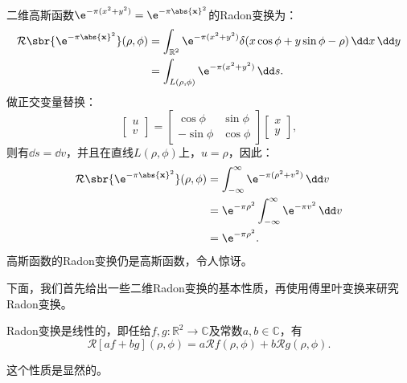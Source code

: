 \begin{example}[高斯函数的Radon变换]
    二维高斯函数$\e^{-\pi(x^2+y^2)}=\e^{-\pi\abs{\mathbf{x}}^2}$的Radon变换为：
    \begin{align}
        \mathcal{R}\sbr{\e^{-\pi\abs{\mathbf{x}}^2}}(\rho,\phi)&=\int_{\mathbb{R}^2}\e^{-\pi(x^2+y^2)}\delta(x\cos\phi+y\sin\phi-\rho)\,\dd x\,\dd y\nonumber\\
        &=\int_{L(\rho,\phi)}\e^{-\pi(x^2+y^2)}\,\dd s.
    \end{align}
    做正交变量替换：
    \begin{equation}
        \begin{bmatrix}u\\v\end{bmatrix}=\begin{bmatrix}
            \cos\phi & \sin\phi\\
            -\sin\phi & \cos\phi
        \end{bmatrix}\begin{bmatrix}x\\y\end{bmatrix},
    \end{equation}
    则有$\dd s=\dd v$，并且在直线$L(\rho,\phi)$上，$u=\rho$，因此：
    \begin{align}
        \mathcal{R}\sbr{\e^{-\pi\abs{\mathbf{x}}^2}}(\rho,\phi)&=\int_{-\infty}^{\infty}\e^{-\pi(\rho^2+v^2)}\,\dd v\nonumber\\
        &=\e^{-\pi\rho^2}\int_{-\infty}^{\infty}\e^{-\pi v^2}\,\dd v\nonumber\\
        &=\e^{-\pi\rho^2}.
    \end{align}
    高斯函数的Radon变换仍是高斯函数，令人惊讶。
\end{example}

下面，我们首先给出一些二维Radon变换的基本性质，再使用傅里叶变换来研究Radon变换。

\begin{proposition}[线性性]
    Radon变换是线性的，即任给$f,g:\mathbb{R}^2\to\mathbb{C}$及常数$a,b\in\mathbb{C}$，有
    \begin{equation}
        \mathcal{R}[af+bg](\rho,\phi)=a\mathcal{R}f(\rho,\phi)+b\mathcal{R}g(\rho,\phi).
    \end{equation}
\end{proposition}
这个性质是显然的。

